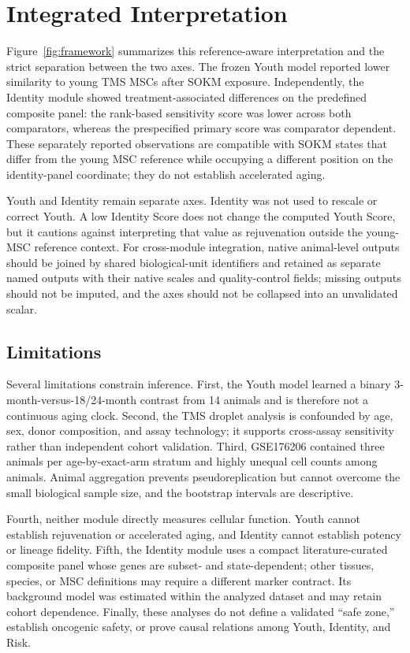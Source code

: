 \documentclass[10pt,twocolumn]{article}
\newcommand{\SOKM}{SOKM}
\begin{document}
\section{Integrated Interpretation}

Figure~\ref{fig:framework} summarizes this reference-aware interpretation and the strict separation between the two axes. The frozen Youth model reported lower similarity to young TMS MSCs after \SOKM{} exposure. Independently, the Identity module showed treatment-associated differences on the predefined composite panel: the rank-based sensitivity score was lower across both comparators, whereas the prespecified primary score was comparator dependent. These separately reported observations are compatible with \SOKM{} states that differ from the young MSC reference while occupying a different position on the identity-panel coordinate; they do not establish accelerated aging.

Youth and Identity remain separate axes. Identity was not used to rescale or correct Youth. A low Identity Score does not change the computed Youth Score, but it cautions against interpreting that value as rejuvenation outside the young-MSC reference context. For cross-module integration, native animal-level outputs should be joined by shared biological-unit identifiers and retained as separate named outputs with their native scales and quality-control fields; missing outputs should not be imputed, and the axes should not be collapsed into an unvalidated scalar.


\subsection{Limitations}

Several limitations constrain inference. First, the Youth model learned a binary 3-month-versus-18/24-month contrast from 14 animals and is therefore not a continuous aging clock. Second, the TMS droplet analysis is confounded by age, sex, donor composition, and assay technology; it supports cross-assay sensitivity rather than independent cohort validation. Third, GSE176206 contained three animals per age-by-exact-arm stratum and highly unequal cell counts among animals. Animal aggregation prevents pseudoreplication but cannot overcome the small biological sample size, and the bootstrap intervals are descriptive.

Fourth, neither module directly measures cellular function. Youth cannot establish rejuvenation or accelerated aging, and Identity cannot establish potency or lineage fidelity. Fifth, the Identity module uses a compact literature-curated composite panel whose genes are subset- and state-dependent; other tissues, species, or MSC definitions may require a different marker contract. Its background model was estimated within the analyzed dataset and may retain cohort dependence. Finally, these analyses do not define a validated ``safe zone,'' establish oncogenic safety, or prove causal relations among Youth, Identity, and Risk.
\end{document}
